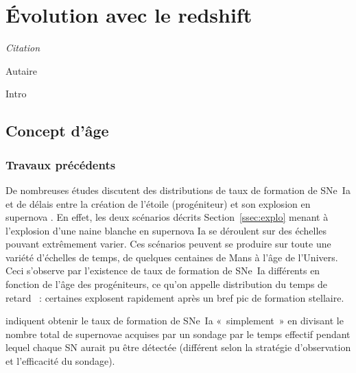 \documentclass[../main/main.tex]{subfiles}
\begin{document}
\raggedbottom

\chapter{\'Evolution avec le redshift}\label{ch:stretch}

\epigraph{\openquote\textit{Citation}\closequote}{Autaire}

Intro

\vfill

\minitoc

\vfill

\newpage

\section{Concept d'\^age}\label{sec:age}

\subsection{Travaux précédents}\label{ssec:rates}

De nombreuses études discutent des distributions de taux de formation de SNe~Ia
et de délais entre la création de l'étoile (progéniteur) et son explosion en
supernova \citep[par exemple,][]{mannucci2005, scannapieco2005, sullivan2006,
smith2012, childress2014, maoz2014}. En effet, les deux scénarios décrits
Section~\ref{ssec:explo} menant à l'explosion d'une naine blanche en supernova
Ia se déroulent sur des échelles pouvant extrêmement varier. Ces scénarios
peuvent se produire sur toute une variété d'échelles de temps, de quelques
centaines de \si{Mans} à l'âge de l'Univers. Ceci s'observe par l'existence de
taux de formation de SNe~Ia différents en fonction de l'âge des progéniteurs, ce
qu'on appelle distribution du temps de retard \citep[DTD en anglais pour Delay
Time Distribution, voir][]{mannucci2006}~: certaines explosent rapidement après
un bref pic de formation stellaire.

\cite{maoz2012} indiquent obtenir le taux de formation de SNe~Ia «~simplement~»
en divisant le nombre total de supernovae acquises par un sondage par le temps
effectif pendant lequel chaque SN aurait pu être détectée (différent selon la
stratégie d'observation et l'efficacité du sondage).

\end{document}
